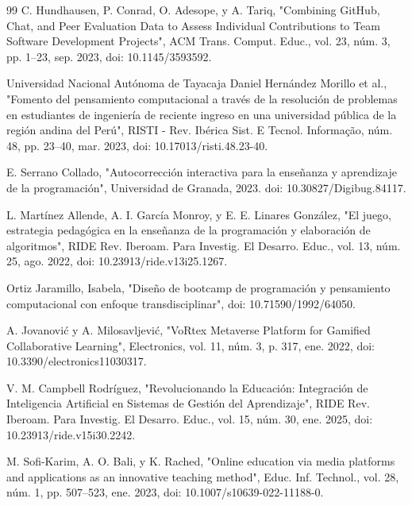 \documentclass[12pt,a4paper]{article}
\begin{document}
\begin{thebibliography}{99}
 C. Hundhausen, P. Conrad, O. Adesope, y A. Tariq, "Combining GitHub, Chat, and Peer Evaluation Data to Assess Individual Contributions to Team Software Development Projects", ACM Trans. Comput. Educ., vol. 23, núm. 3, pp. 1–23, sep. 2023, doi: 10.1145/3593592.

 Universidad Nacional Autónoma de Tayacaja Daniel Hernández Morillo et al., "Fomento del pensamiento computacional a través de la resolución de problemas en estudiantes de ingeniería de reciente ingreso en una universidad pública de la región andina del Perú", RISTI - Rev. Ibérica Sist. E Tecnol. Informação, núm. 48, pp. 23–40, mar. 2023, doi: 10.17013/risti.48.23-40.

 E. Serrano Collado, "Autocorrección interactiva para la enseñanza y aprendizaje de la programación", Universidad de Granada, 2023. doi: 10.30827/Digibug.84117.

 L. Martínez Allende, A. I. García Monroy, y E. E. Linares González, "El juego, estrategia pedagógica en la enseñanza de la programación y elaboración de algoritmos", RIDE Rev. Iberoam. Para Investig. El Desarro. Educ., vol. 13, núm. 25, ago. 2022, doi: 10.23913/ride.v13i25.1267.

 Ortiz Jaramillo, Isabela, "Diseño de bootcamp de programación y pensamiento computacional con enfoque transdisciplinar", doi: 10.71590/1992/64050.

 A. Jovanović y A. Milosavljević, "VoRtex Metaverse Platform for Gamified Collaborative Learning", Electronics, vol. 11, núm. 3, p. 317, ene. 2022, doi: 10.3390/electronics11030317.

 V. M. Campbell Rodríguez, "Revolucionando la Educación: Integración de Inteligencia Artificial en Sistemas de Gestión del Aprendizaje", RIDE Rev. Iberoam. Para Investig. El Desarro. Educ., vol. 15, núm. 30, ene. 2025, doi: 10.23913/ride.v15i30.2242.

 M. Sofi-Karim, A. O. Bali, y K. Rached, "Online education via media platforms and applications as an innovative teaching method", Educ. Inf. Technol., vol. 28, núm. 1, pp. 507–523, ene. 2023, doi: 10.1007/s10639-022-11188-0.
\end{thebibliography}
\end{document}
